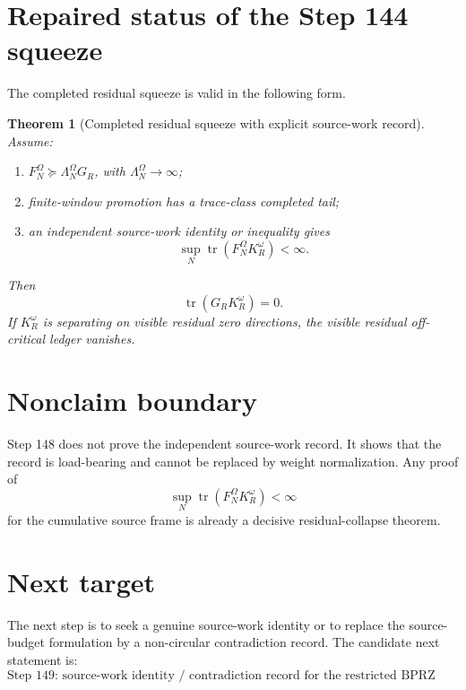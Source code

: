 \documentclass[11pt]{article}
\newtheorem{theorem}{Theorem}
\begin{document}
\section{Repaired status of the Step 144 squeeze}
The completed residual squeeze is valid in the following form.

\begin{theorem}[Completed residual squeeze with explicit source-work record]
Assume:
\begin{enumerate}[label=(\roman*)]
\item \(F_N^\Omega\succeq \Lambda_N^\Omega G_R\), with \(\Lambda_N^\Omega\to\infty\);
\item finite-window promotion has a trace-class completed tail;
\item an independent source-work identity or inequality gives
\[
\sup_N\operatorname{tr}(F_N^\Omega K_R^\omega)<\infty.
\]
\end{enumerate}
Then
\[
\operatorname{tr}(G_RK_R^\omega)=0.
\]
If \(K_R^\omega\) is separating on visible residual zero directions, the visible residual off-critical ledger vanishes.
\end{theorem}

\section{Nonclaim boundary}
Step 148 does not prove the independent source-work record. It shows that the record is load-bearing and cannot be replaced by weight normalization. Any proof of
\[
\sup_N\operatorname{tr}(F_N^\Omega K_R^\omega)<\infty
\]
for the cumulative source frame is already a decisive residual-collapse theorem.

\section{Next target}
The next step is to seek a genuine source-work identity or to replace the source-budget formulation by a non-circular contradiction record. The candidate next statement is:
\[
\boxed{\text{Step 149: source-work identity / contradiction record for the restricted BPRZ frame.}}
\]
\end{document}

